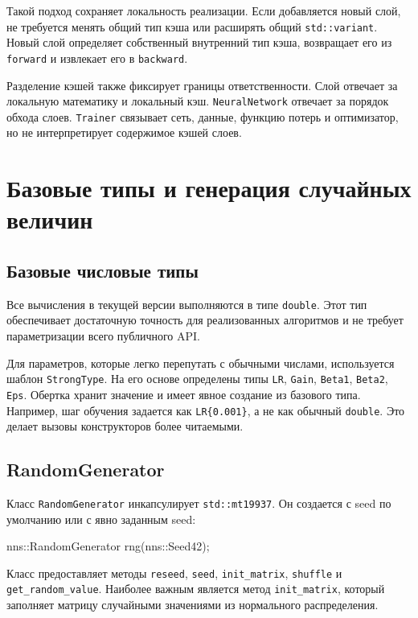 \documentclass{article}
\begin{document}
Такой подход сохраняет локальность реализации. Если добавляется новый
слой, не требуется менять общий тип кэша или расширять общий
\texttt{std::variant}. Новый слой определяет собственный внутренний
тип кэша, возвращает его из \texttt{forward} и извлекает его в
\texttt{backward}.

Разделение кэшей также фиксирует границы ответственности. Слой
отвечает за локальную математику и локальный кэш.
\texttt{NeuralNetwork} отвечает за порядок обхода слоев.
\texttt{Trainer} связывает сеть, данные, функцию потерь и оптимизатор,
но не интерпретирует содержимое кэшей слоев.

\section{Базовые типы и генерация случайных величин}

\subsection{Базовые числовые типы}

Все вычисления в текущей версии выполняются в типе \texttt{double}.
Этот тип обеспечивает достаточную точность для реализованных
алгоритмов и не требует параметризации всего публичного API.

Для параметров, которые легко перепутать с обычными числами,
используется шаблон \texttt{StrongType}. На его основе определены типы
\texttt{LR}, \texttt{Gain}, \texttt{Beta1}, \texttt{Beta2},
\texttt{Eps}. Обертка хранит значение и имеет явное создание из
базового типа. Например, шаг обучения задается как
\texttt{LR\{0.001\}}, а не как обычный \texttt{double}. Это делает
вызовы конструкторов более читаемыми.

\subsection{RandomGenerator}

Класс \texttt{RandomGenerator} инкапсулирует \texttt{std::mt19937}. Он
создается с seed по умолчанию или с явно заданным seed:
\begin{cppcode}
nns::RandomGenerator rng(nns::Seed{42});
\end{cppcode}
Класс предоставляет методы \texttt{reseed}, \texttt{seed},
\texttt{init\_matrix}, \texttt{shuffle} и \texttt{get\_random\_value}.
Наиболее важным является метод \texttt{init\_matrix}, который
заполняет матрицу случайными значениями из нормального распределения.
\end{document}
